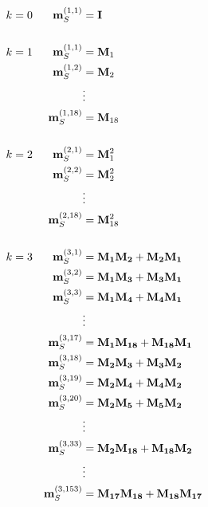 %
\begin{subequations}
\begin{align}
	\label{E:38}
	k &= 0  & \mathbf{m}^{(1,1)}_S   &= \mathbf{I} 				&   			\\[15pt]
	k &= 1  & \mathbf{m}^{(1,1)}_S   &= \mathbf{M}_1 			&   			\\
	  &     & \mathbf{m}^{(1,2)}_S   &= \mathbf{M}_2 			&   			\\
	  &	    &    				     &  \vdots  &   \notag 						\\
	  &     & \mathbf{m}^{(1,18)}_S  &= \mathbf{M}_{18} 		& 				\\[15pt]
	k &= 2  & \mathbf{m}^{(2,1)}_S   &= \mathbf{M}^2_1 			&   			\\  
	  &  	& \mathbf{m}^{(2,2)}_S   &= \mathbf{M}^2_2 			& 				\\
	  &     &  						 &  \vdots 	& 	\notag 						\\ 
	  &     & \mathbf{m}^{(2,18)}_S  &= \mathbf{M}^2_{18} 		& 				\\[15pt]   
	k &= 3  & \mathbf{m}^{(3,1)}_S   &= \mathbf{M_1M_2} + \mathbf{M_2M_1}  &   	\\  
	  &  	& \mathbf{m}^{(3,2)}_S   &= \mathbf{M_1M_3} + \mathbf{M_3M_1}  &   	\\  
	  &  	& \mathbf{m}^{(3,3)}_S   &= \mathbf{M_1M_4} + \mathbf{M_4M_1}  &   	\\  
	  &     &  						 &  \vdots 	& 	\notag \\ 
	  &  	& \mathbf{m}^{(3,17)}_S  &= \mathbf{M_1M_{18}} + \mathbf{M_{18}M_1} & \\ 
	  &  	& \mathbf{m}^{(3,18)}_S  &= \mathbf{M_2M_3} + \mathbf{M_3M_2}  &   	\\
	  &  	& \mathbf{m}^{(3,19)}_S  &= \mathbf{M_2M_4} + \mathbf{M_4M_2}  &   	\\  
	  &  	& \mathbf{m}^{(3,20)}_S  &= \mathbf{M_2M_5} + \mathbf{M_5M_2}  &   	\\
	  &     &  						 &  \vdots & 	\notag \\
	  &  	& \mathbf{m}^{(3,33)}_S  &= \mathbf{M_2M_{18}} + \mathbf{M_{18}M_2}  &  \\
	  &     &  						 &  \vdots 	& 	\notag \\
	  &  	& \mathbf{m}^{(3,153)}_S &= \mathbf{M_{17}M_{18}} + \mathbf{M_{18}M_{17}} &   
\end{align}
\end{subequations}
%
%    

